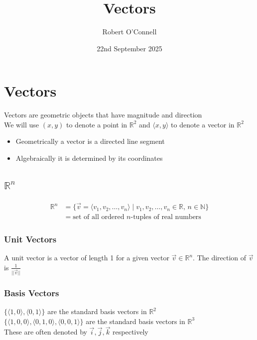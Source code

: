 \documentclass{article}
\title{\textbf{Vectors}}
\author{Robert O'Connell}
\date{22nd September 2025}
\begin{document}
\maketitle
\vspace{5mm}

\section*{Vectors}
Vectors are geometric objects that have magnitude and direction \\
We will use $(x,y)$ to denote a point in $\mathbb{R}^2$ and $\langle x,y \rangle$ to denote a vector
in $\mathbb{R}^2$
\begin{itemize}
    \item Geometrically a vector is a directed line segment
    \item Algebraically it is determined by its coordinates
\end{itemize}
\subsection*{\(\mathbb{R}^n\)}
\begin{align*}
    \mathbb{R}^n &= \{\vec{v} = \langle v_1, v_2, \dots , v_n \rangle \mid v_1, v_2, \dots , v_n \in \mathbb{R},\, n \in \mathbb{N}\} \\
    &= \text{set of all ordered $n$-tuples of real numbers}
\end{align*}



\subsubsection*{Unit Vectors}
    A unit vector is a vector of length 1 for a given vector \(\vec{v} \in \mathbb{R}^n\). The direction of \(\vec{v}\)
    is \(\frac{1}{||\vec{v}||}\)

\subsubsection*{Basis Vectors}
\(\{ \langle 1,0 \rangle, \langle 0,1 \rangle \}\) are the standard basis vectors in \(\mathbb{R}^2\)
\\
\(\{ \langle 1,0,0 \rangle, \langle 0,1,0 \rangle, \langle 0,0,1 \rangle \}\) are the standard basis vectors in \(\mathbb{R}^3\)
\\
These are often denoted by \(\vec{i}, \vec{j}, \vec{k}\) respectively
\vspace{5mm}
\end{document}
